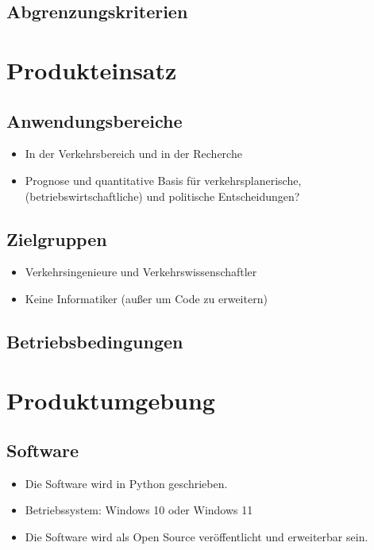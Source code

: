 \documentclass{article}
\begin{document}
\subsection{Abgrenzungskriterien}
    
\section{Produkteinsatz}
\subsection{Anwendungsbereiche}
\begin{itemize}
    \item In der Verkehrsbereich und in der Recherche
\end{itemize}
\begin{itemize}
    \item Prognose und quantitative Basis für verkehrsplanerische, (betriebswirtschaftliche) und politische Entscheidungen?
\end{itemize}
\subsection{Zielgruppen}

\begin{itemize}
    \item Verkehrsingenieure und Verkehrswissenschaftler
    \item Keine Informatiker (außer um Code zu erweitern)
\end{itemize}
  
\subsection{Betriebsbedingungen}

\section{Produktumgebung}
\subsection{Software}
\begin{itemize}
    \item Die Software wird in Python geschrieben.
    \item Betriebssystem: Windows 10 oder Windows 11
    \item Die Software wird als Open Source veröffentlicht und erweiterbar sein.
\end{itemize}
\end{document}
